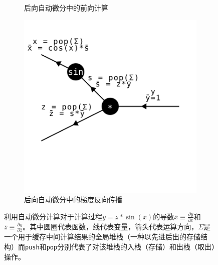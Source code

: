 \documentclass[A4,twoside,fontset=ubuntu,UTF8]{ctexart}
\begin{document}
\begin{figure}[t]
\begin{subfigure}[b]{0.32\textwidth}
    \caption{\small 后向自动微分中的前向计算}
\end{subfigure}
\begin{subfigure}[b]{0.32\textwidth}
    \centering
    \includegraphics[width=\textwidth, trim={0 3cm 1cm 1cm}, clip]{./backward-backward.pdf}
    \caption{\small 后向自动微分中的梯度反向传播}
\end{subfigure}
        \caption{利用自动微分计算对于计算过程$y = z * \sin(x)$的导数$\overline{x}\equiv \frac{\partial y}{\partial x}$和$\overline{z}\equiv \frac{\partial y}{\partial z}$。其中圆圈代表函数，线代表变量，箭头代表运算方向，$\Sigma$是一个用于缓存中间计算结果的全局堆栈（一种以先进后出的存储结构）而\texttt{push}和\texttt{pop}分别代表了对该堆栈的入栈（存储）和出栈（取出）操作。}\label{fig:autodifftypes} 
\end{figure}
\end{document}

